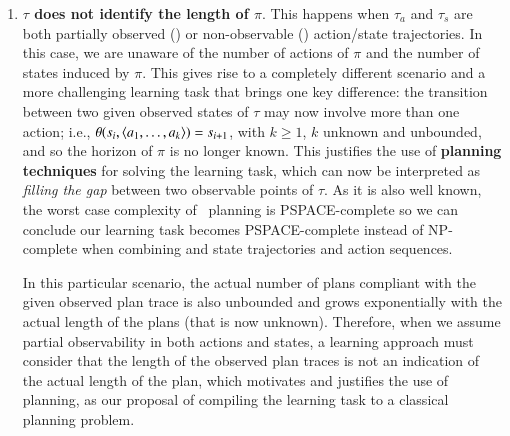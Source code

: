 \begin{enumerate}
\item \textcolor[rgb]{1.00,0.00,0.00}{\textbf{$\tau$ does not identify the length of $\pi$}. This happens when $\tau_a$ and $\tau_s$ are both partially observed (\PO) or non-observable (\NO) action/state trajectories. In this case, we are unaware of the number of actions of $\pi$ and the number of states induced by $\pi$. This gives rise to a completely different scenario and a more challenging learning task that brings one key difference: the transition between two given observed states of $\tau$ may now involve more than one action; i.e., $\theta(s_i,{\langle a_1,\ldots,a_k \rangle})=s_{i+1}$, with $k \geq 1$, $k$ unknown and unbounded, and so the horizon of $\pi$ is no longer known. This justifies the use of \textbf{planning techniques} for solving the learning task, which can now be interpreted as \emph{filling the gap} between two observable points of $\tau$. As it is also well known, the worst case complexity of \strips\ planning is PSPACE-complete so we can conclude our learning task becomes PSPACE-complete instead of NP-complete when combining \PO and \NO state trajectories and action sequences.}

   \textcolor[rgb]{1.00,0.00,0.00}{ In this particular scenario, the actual number of plans compliant with the given observed plan trace is also unbounded and grows exponentially with the actual length of the plans (that is now unknown). Therefore, when we assume partial observability in both actions and states, a learning approach must consider that the length of the observed plan traces is not an indication of the actual length of the plan, which motivates and justifies the use of planning, as our proposal of compiling the learning task to a classical planning problem.}

\end{enumerate}







